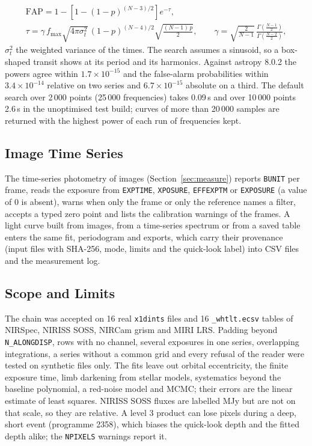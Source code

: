 \documentclass[11pt,a4paper]{article}
\newcommand{\code}[1]{\texttt{\small #1}}
\begin{document}
    \begin{equation}
    \begin{gathered}
        \text{FAP} = 1 - \left[1 - (1 - p)^{(N-3)/2}\right] e^{-\tau}, \\
        \tau = \gamma\, f_{\max} \sqrt{4\pi\sigma_t^2}\,(1 - p)^{(N-4)/2} \sqrt{\tfrac{(N - 1)\,p}{2}}, \qquad
        \gamma = \sqrt{\tfrac{2}{N-1}}\,\frac{\Gamma\!\left(\frac{N-1}{2}\right)}{\Gamma\!\left(\frac{N-2}{2}\right)},
    \end{gathered}
    \end{equation}
    $\sigma_t^2$ the weighted variance of the times. The search assumes a sinusoid, so a box-shaped transit shows at its period and its harmonics. Against astropy 8.0.2 the powers agree within $1.7 \times 10^{-15}$ and the false-alarm probabilities within $3.4 \times 10^{-14}$ relative on two series and $6.7 \times 10^{-15}$ absolute on a third. The default search over 2\,000 points (25\,000 frequencies) takes 0.09\,s and over 10\,000 points 2.6\,s in the unoptimised test build; curves of more than 20\,000 samples are returned with the highest power of each run of frequencies kept.

    \subsection{Image Time Series}

    The time-series photometry of images (Section~\ref{sec:measure}) reports \code{BUNIT} per frame, reads the exposure from \code{EXPTIME}, \code{XPOSURE}, \code{EFFEXPTM} or \code{EXPOSURE} (a value of 0 is absent), warns when only the frame or only the reference names a filter, accepts a typed zero point and lists the calibration warnings of the frames. A light curve built from images, from a time-series spectrum or from a saved table enters the same fit, periodogram and exports, which carry their provenance (input files with SHA-256, mode, limits and the quick-look label) into CSV files and the measurement log.

    \subsection{Scope and Limits}

    The chain was accepted on 16 real \code{x1dints} files and 16 \code{\_whtlt.ecsv} tables of NIRSpec, NIRISS SOSS, NIRCam grism and MIRI LRS. Padding beyond \code{N\_ALONGDISP}, rows with no channel, several exposures in one series, overlapping integrations, a series without a common grid and every refusal of the reader were tested on synthetic files only. The fits leave out orbital eccentricity, the finite exposure time, limb darkening from stellar models, systematics beyond the baseline polynomial, a red-noise model and MCMC; their errors are the linear estimate of least squares. NIRISS SOSS fluxes are labelled MJy but are not on that scale, so they are relative. A level 3 product can lose pixels during a deep, short event (programme 2358), which biases the quick-look depth and the fitted depth alike; the \code{NPIXELS} warnings report it.
\end{document}
